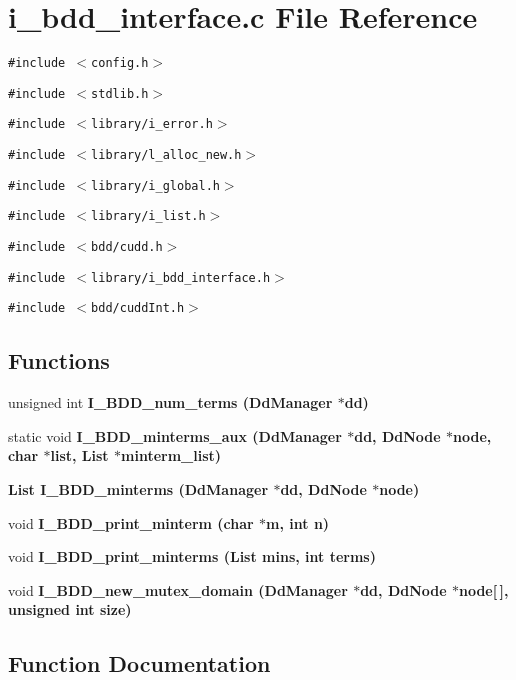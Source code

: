 \section{i\_\-bdd\_\-interface.c File Reference}
\label{i__bdd__interface_8c}
{\tt \#include $<$config.h$>$}\par
{\tt \#include $<$stdlib.h$>$}\par
{\tt \#include $<$library/i\_\-error.h$>$}\par
{\tt \#include $<$library/l\_\-alloc\_\-new.h$>$}\par
{\tt \#include $<$library/i\_\-global.h$>$}\par
{\tt \#include $<$library/i\_\-list.h$>$}\par
{\tt \#include $<$bdd/cudd.h$>$}\par
{\tt \#include $<$library/i\_\-bdd\_\-interface.h$>$}\par
{\tt \#include $<$bdd/cudd\-Int.h$>$}\par
\subsection*{Functions}
\begin{CompactItemize}
\item 
unsigned int \bf{I\_\-BDD\_\-num\_\-terms} (Dd\-Manager $\ast$dd)
\item 
static void \bf{I\_\-BDD\_\-minterms\_\-aux} (Dd\-Manager $\ast$dd, Dd\-Node $\ast$\bf{node}, char $\ast$\bf{list}, \bf{List} $\ast$minterm\_\-list)
\item 
\bf{List} \bf{I\_\-BDD\_\-minterms} (Dd\-Manager $\ast$dd, Dd\-Node $\ast$\bf{node})
\item 
void \bf{I\_\-BDD\_\-print\_\-minterm} (char $\ast$m, int n)
\item 
void \bf{I\_\-BDD\_\-print\_\-minterms} (\bf{List} mins, int terms)
\item 
void \bf{I\_\-BDD\_\-new\_\-mutex\_\-domain} (Dd\-Manager $\ast$dd, Dd\-Node $\ast$\bf{node}[$\,$], unsigned int size)
\end{CompactItemize}


\subsection{Function Documentation}
